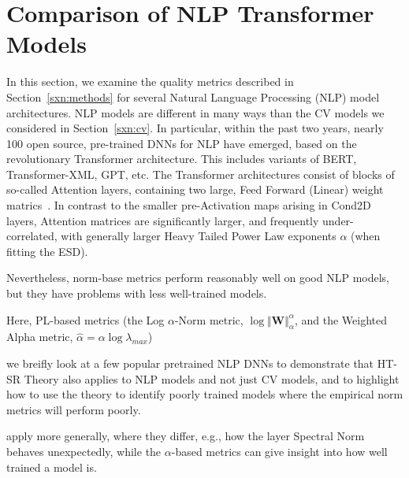 \section{Comparison of NLP Transformer Models}
\label{sxn:nlp}

In this section, we examine the quality metrics described in Section~\ref{sxn:methods} for several Natural Language Processing (NLP) model architectures.
NLP models are different in many ways than the CV models we considered in Section~\ref{sxn:cv}.
In particular, within the past two years, nearly 100 open source, pre-trained DNNs for NLP have emerged, based on the revolutionary Transformer architecture.
This includes variants of BERT, Transformer-XML, GPT, etc.
The Transformer architectures consist of blocks of so-called Attention layers, containing two large, Feed Forward (Linear) weight matrics~\cite{Attn2017}. 
In contrast to the smaller pre-Activation maps arising in Cond2D layers, Attention matrices are significantly larger, 
and frequently under-correlated, with generally larger Heavy Tailed Power Law exponents $\alpha$ (when fitting the ESD).  

Nevertheless, norm-base metrics perform reasonably well on good NLP models, but they have problems with less well-trained models.

Here, PL-based metrics 
(the Log $\alpha$-Norm metric, $\log\Vert\mathbf{W}\Vert_{\alpha}^{\alpha}$, and the Weighted Alpha metric, $\hat\alpha =\alpha\log\lambda_{max} $)

we breifly look at a few popular pretrained NLP DNNs to demonstrate that HT-SR Theory 
also
applies to NLP models and not just CV models, and to highlight how to use the theory to identify
poorly trained models where the empirical norm metrics will perform poorly.




apply more generally, where they differ, e.g., how the layer Spectral Norm behaves unexpectedly, while the $\alpha$-based metrics can give insight into how well trained a model is.



